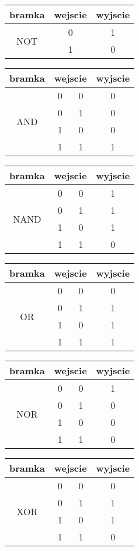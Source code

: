 \documentclass[a4paper]{article}
\begin{document}
\begin{table}[]
\begin{tabular}{c |c | c}
bramka & wejscie & wyjscie\\
\hline
\multirow{2}{4em}{NOT} & 0 & 1\\
& 1 & 0\\
\end{tabular}
\end{table}


\begin{table}
\begin{tabular}{c |c c| c}
bramka & \multicolumn {2}{c|}{wejscie} & wyjscie\\
\hline
\multirow{4}{4em}{AND} & 0 & 0 & 0\\
& 0 & 1 & 0\\
& 1 & 0 & 0\\
& 1 & 1 & 1\\
\end{tabular}
\end{table}



\begin{table}
\begin{tabular}{c |c c| c}
bramka & \multicolumn {2}{c|}{wejscie} & wyjscie\\
\hline
\multirow{4}{4em}{NAND} & 0 & 0 & 1\\
& 0 & 1 & 1\\
& 1 & 0 & 1\\
& 1 & 1 & 0\\
\end{tabular}
\end{table}



\begin{table}
\begin{tabular}{c |c c| c}
bramka & \multicolumn {2}{c|}{wejscie} & wyjscie\\
\hline
\multirow{4}{4em}{OR} & 0 & 0 & 0\\
& 0 & 1 & 1\\
& 1 & 0 & 1\\
& 1 & 1 & 1\\
\end{tabular}
\end{table}




\begin{table}
\begin{tabular}{c |c c| c}
bramka & \multicolumn {2}{c|}{wejscie} & wyjscie\\
\hline
\multirow{4}{4em}{NOR} & 0 & 0 & 1\\
& 0 & 1 & 0\\
& 1 & 0 & 0\\
& 1 & 1 & 0\\
\end{tabular}
\end{table}



\begin{table}[h]
\begin{tabular}{c |c c| c}
bramka & \multicolumn {2}{c|}{wejscie} & wyjscie\\
\hline
\multirow{4}{4em}{XOR} & 0 & 0 & 0\\
& 0 & 1 & 1\\
& 1 & 0 & 1\\
& 1 & 1 & 0\\
\end{tabular}
\end{table}
\end{document}

